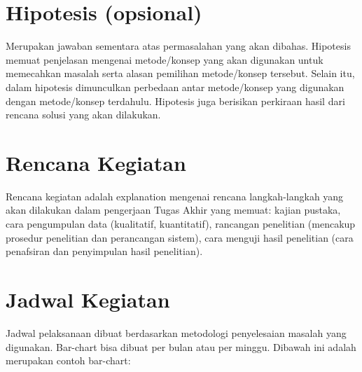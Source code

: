 \documentclass[a4paper,12pt,oneside]{book}
\begin{document}
\section{Hipotesis (opsional)}
Merupakan jawaban sementara atas permasalahan yang akan dibahas. Hipotesis memuat penjelasan mengenai metode/konsep yang akan digunakan untuk memecahkan masalah serta alasan pemilihan metode/konsep tersebut. Selain itu, dalam hipotesis dimunculkan perbedaan antar metode/konsep yang digunakan dengan metode/konsep terdahulu. Hipotesis juga berisikan perkiraan hasil dari rencana solusi yang akan dilakukan.


\section{Rencana Kegiatan}
Rencana kegiatan adalah explanation mengenai rencana langkah-langkah yang akan dilakukan dalam pengerjaan Tugas Akhir yang memuat: kajian pustaka, cara pengumpulan data (kualitatif, kuantitatif), rancangan penelitian (mencakup prosedur penelitian dan perancangan sistem), cara menguji hasil penelitian (cara penafsiran dan penyimpulan hasil penelitian).


\section{Jadwal Kegiatan}

Jadwal pelaksanaan dibuat berdasarkan metodologi penyelesaian masalah yang digunakan. Bar-chart bisa dibuat per bulan atau per minggu. Dibawah ini adalah merupakan contoh bar-chart:
\end{document}
